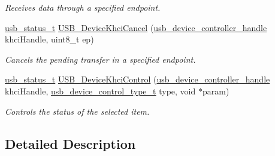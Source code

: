 \begin{DoxyCompactItemize}
\begin{DoxyCompactList}\small\item\em Receives data through a specified endpoint. \end{DoxyCompactList}\item 
\hyperlink{group__usb__drv_ga3172b9f50553fb6d8aa2823d10a39c58}{usb\-\_\-status\-\_\-t} \hyperlink{group__usb__device__controller__khci__driver_ga9cd047248d7e6e682112e8ab79ddf027}{U\-S\-B\-\_\-\-Device\-Khci\-Cancel} (\hyperlink{group__usb__device__controller__driver_gaec03ce2e4732aa876cd2a91cf8e93b5b}{usb\-\_\-device\-\_\-controller\-\_\-handle} khci\-Handle, uint8\-\_\-t ep)
\begin{DoxyCompactList}\small\item\em Cancels the pending transfer in a specified endpoint. \end{DoxyCompactList}\item 
\hyperlink{group__usb__drv_ga3172b9f50553fb6d8aa2823d10a39c58}{usb\-\_\-status\-\_\-t} \hyperlink{group__usb__device__controller__khci__driver_gab532e6ca027a37aa09d8ba7a9f5e8983}{U\-S\-B\-\_\-\-Device\-Khci\-Control} (\hyperlink{group__usb__device__controller__driver_gaec03ce2e4732aa876cd2a91cf8e93b5b}{usb\-\_\-device\-\_\-controller\-\_\-handle} khci\-Handle, \hyperlink{group__usb__device__controller__driver_gae16dc18943ae9da34a2b122859568b5e}{usb\-\_\-device\-\_\-control\-\_\-type\-\_\-t} type, void $\ast$param)
\begin{DoxyCompactList}\small\item\em Controls the status of the selected item. \end{DoxyCompactList}\end{DoxyCompactItemize}


\subsection{Detailed Description}


